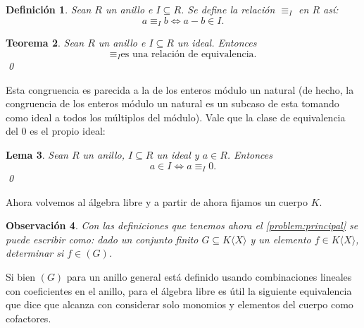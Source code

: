 \documentclass[12pt]{report}
\theoremstyle{customstyle}
\newtheorem{theorem}{Teorema}[chapter]
\newtheorem{definition}[theorem]{Definición}
\newtheorem{lemma}[theorem]{Lema}
\newtheorem{observation}[theorem]{Observación}
\theoremstyle{factstyle}
\begin{document}
\begin{definition}\label{def:congruencia mod ideal}
  Sean $R$ un anillo e $I ⊆ R$. Se define la relación $≡_I$ en $R$ así:
  \[ a ≡_I b ⇔ a - b ∈ I \text{.}\]
\end{definition}

\begin{theorem}\label{thm:congruencia mod ideal es equivalencia}
  Sean $R$ un anillo e $I ⊆ R$ un ideal. Entonces
  \[ ≡_I \text{es una relación de equivalencia} \text{.}\]
  \qed
\end{theorem}

Esta congruencia es parecida a la de los enteros módulo un natural (de hecho, la congruencia de los enteros módulo un natural es un subcaso de esta tomando como ideal a todos los múltiplos del módulo). Vale que la clase de equivalencia del $0$ es el propio ideal:

\begin{lemma}\label{lemma:en ideal ⇔ congruente 0}
  Sean $R$ un anillo, $I ⊆ R$ un ideal y $a ∈ R$. Entonces
  \[ a ∈ I ⇔ a ≡_I 0 \text{.}\]
  \qed
\end{lemma}

Ahora volvemos al álgebra libre y a partir de ahora fijamos un cuerpo $K$.

\begin{observation}
  Con las definiciones que tenemos ahora el \cref{problem:principal} se puede escribir como: dado un conjunto finito $G ⊆ K⟨X⟩$ y un elemento $f ∈ K⟨X⟩$, determinar si $f ∈ (G)$.
\end{observation}

Si bien $(G)$ para un anillo general está definido usando combinaciones lineales con coeficientes en el anillo, para el álgebra libre es útil la siguiente equivalencia que dice que alcanza con considerar solo monomios y elementos del cuerpo como cofactores.
\end{document}
